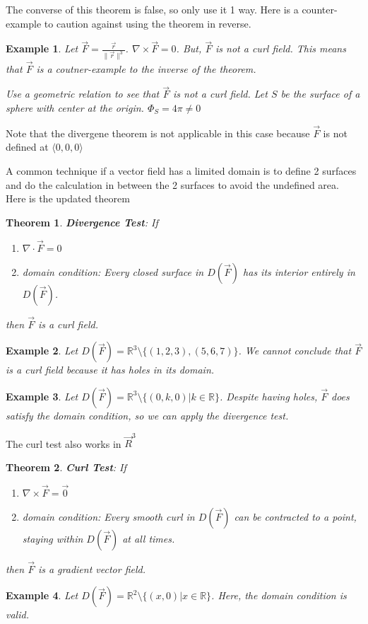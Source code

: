 \documentclass[11pt]{article}
\newtheorem{thm}{Theorem}
\newtheorem{ex}{Example}
\begin{document}
        The converse of this theorem is false, so only use it 1 way. Here is a counter-example
        to caution against using the theorem in reverse.
        \begin{ex}
          Let $\vec{F} = \frac{\vec{r}}{\|\vec{r}\|^{3}}$. $\nabla \times \vec{F} = 0$. But, $\vec{F}$ is not a curl
          field. This means that $\vec{F}$ is a coutner-example to the inverse of the theorem.

          Use a geometric relation to see that $\vec{F}$ is not a curl field. Let $S$ be the surface of
          a sphere with center at the origin. $\Phi_{S} = 4\pi \neq 0$
        \end{ex}
        Note that the divergene theorem is not applicable in this case because $\vec{F}$ is not defined at $\langle 0, 0, 0 \rangle$

        A common technique if a vector field has a limited domain is to define 2 surfaces and do the calculation
        in between the 2 surfaces to avoid the undefined area.
        Here is the updated theorem
        \begin{thm}
          \textbf{Divergence Test}:
          If
          \begin{enumerate}
            \item $\nabla \cdot \vec{F} = 0$
                  \item domain condition: Every closed surface in $D(\vec{F})$ has its interior entirely in $D(\vec{F})$.
          \end{enumerate}
          then $\vec{F}$ is a curl field.
        \end{thm}
        \begin{ex}
          Let $D(\vec{F}) = \mathbb{R}^{3} \setminus \{(1,2,3), (5,6,7)\}$. We cannot conclude that $\vec{F}$ is a curl
          field because it has holes in its domain.
        \end{ex}
        \begin{ex}
          Let $D(\vec{F}) = \mathbb{R}^{3} \setminus \{(0,k,0) | k \in \mathbb{R}\}$. Despite having holes, $\vec{F}$
          does satisfy the domain condition, so we can apply the divergence test.
        \end{ex}

        The curl test also works in $\vec{R}^{3}$
        \begin{thm}
          \textbf{Curl Test}:
          If
          \begin{enumerate}
            \item $\nabla \times \vec{F} = \vec{0}$
                  \item domain condition: Every smooth curl in $D(\vec{F})$ can be contracted to a point, staying within $D(\vec{F})$ at all times.
          \end{enumerate}
          then $\vec{F}$ is a gradient vector field.
          \end{thm}
          \begin{ex}
            Let $D(\vec{F}) = \mathbb{R}^{2} \setminus \{(x,0) | x \in \mathbb{R}\}$. Here, the domain condition is valid.
            \end{ex}
\end{document}
